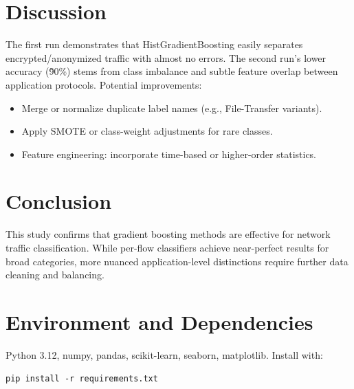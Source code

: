\documentclass[12pt]{article}
\begin{document}
\section{Discussion}
The first run demonstrates that HistGradientBoosting easily separates encrypted/anonymized traffic with almost no errors. The second run's lower accuracy (\~90\%) stems from class imbalance and subtle feature overlap between application protocols. Potential improvements:
\begin{itemize}
  \item Merge or normalize duplicate label names (e.g., File-Transfer variants).
  \item Apply SMOTE or class-weight adjustments for rare classes.
  \item Feature engineering: incorporate time-based or higher-order statistics.
\end{itemize}

\section{Conclusion}
This study confirms that gradient boosting methods are effective for network traffic classification. While per-flow classifiers achieve near-perfect results for broad categories, more nuanced application-level distinctions require further data cleaning and balancing.

\appendix
\section{Environment and Dependencies}
Python 3.12, numpy, pandas, scikit-learn, seaborn, matplotlib. Install with:
\begin{verbatim}
pip install -r requirements.txt
\end{verbatim}
\end{document}
